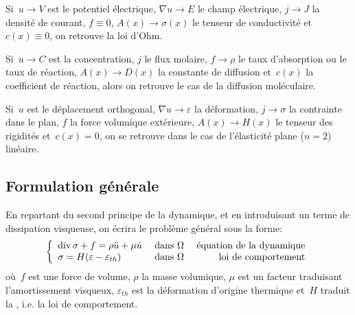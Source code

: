 \medskip
Si~$u\longrightarrow V$ est le potentiel électrique, $\nabla u\longrightarrow E$ le champ
électrique, $j\longrightarrow J$ la densité de courant, $f\equiv 0$, $A(x)
\longrightarrow\sigma(x)$ le tenseur de conductivité et~$c(x)\equiv 0$, on
retrouve la loi d'Ohm.

\medskip
Si~$u\longrightarrow C$ est la concentration, $j$ le flux molaire,
$f\longrightarrow\rho$ le taux d'absorption ou le taux de réaction, $A(x)\longrightarrow
D(x)$ la constante de diffusion et~$c(x)$ la coefficient de réaction, alors on retrouve 
le cas de la diffusion moléculaire.

\medskip
Si~$u$ est le déplacement orthogonal, $\nabla u\longrightarrow\varepsilon$
la déformation, $j\longrightarrow\sigma$ la contrainte dans le plan, $f$
la force volumique extérieure, $A(x)\longrightarrow H(x)$ le tenseur des
rigidités et~$c(x)=0$, on se retrouve dans le cas de l'élasticité plane ($n=2$)
linéaire.

\medskip
\subsection{Formulation générale}

En repartant du second principe de la dynamique, et en introduisant un terme
de dissipation visqueuse, on écrira le problème général sous la forme:
\begin{equation}
\left\{
\begin{array}{llr}
\operatorname{div}\sigma + f = \rho \ddot{u} + \mu \dot{u} & \text{ dans } \Omega & \text{ équation de la dynamique}\\
\sigma=H(\varepsilon-\varepsilon_{th}) & \text{ dans } \Omega & \text{ loi de comportement}\\
\end{array}
\right.
\end{equation}
où~$f$ est une force de volume, $\rho$ la masse volumique, $\mu$ est un facteur
traduisant l'amortissement visqueux, $\varepsilon_{th}$ est la déformation d'origine
thermique et~$H$ traduit la ,
i.e. la loi de comportement.


